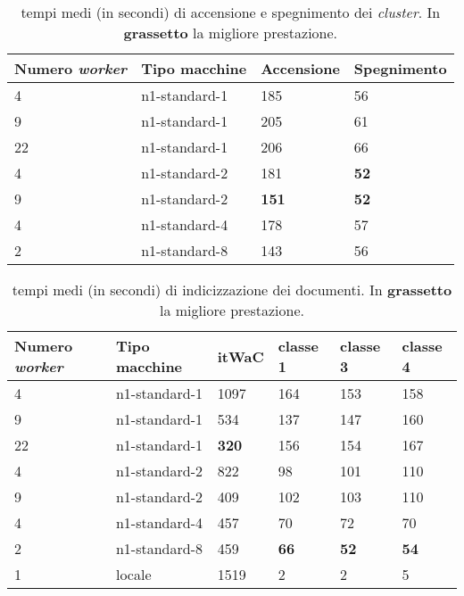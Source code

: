 \begin{table}[ht]
\centering
\begin{tabular}{|l|l|l|l|}
\hline
Numero \textit{worker} & Tipo macchine & Accensione     & Spegnimento  \\ \hline
4              & n1-standard-1 & 185               & 56              \\
9              & n1-standard-1 & 205               & 61              \\
22             & n1-standard-1 & 206               & 66              \\
4              & n1-standard-2 & 181               & \textbf{52}     \\
9              & n1-standard-2 & \textbf{151}      & \textbf{52}     \\
4              & n1-standard-4 & 178               & 57              \\
2              & n1-standard-8 & 143               & 56              \\ \hline
\end{tabular}
\caption{tempi medi (in secondi) di accensione e spegnimento dei \textit{cluster}. In \textbf{grassetto} la migliore prestazione.}
\label{table:boot}
\end{table}

\begin{table}[ht]
\centering
\begin{tabular}{|l|l|l|l|l|l|}
\hline
Numero \textit{worker} & Tipo macchine & itWaC     & classe 1  & classe 3  & classe 4  \\ \hline
4              & n1-standard-1 & 1097         & 164          & 153          & 158          \\
9              & n1-standard-1 & 534          & 137          & 147          & 160          \\
22             & n1-standard-1 & \textbf{320} & 156          & 154          & 167          \\
4              & n1-standard-2 & 822          & 98           & 101          & 110          \\
9              & n1-standard-2 & 409          & 102          & 103          & 110          \\
4              & n1-standard-4 & 457          & 70           & 72           & 70           \\
2              & n1-standard-8 & 459          & \textbf{66}  & \textbf{52}  & \textbf{54}  \\ \hline
1              & locale        & 1519         & 2            & 2            & 5            \\ \hline
\end{tabular}
\caption{tempi medi (in secondi) di indicizzazione dei documenti. In \textbf{grassetto} la migliore prestazione.}
\label{table:index}
\end{table}


